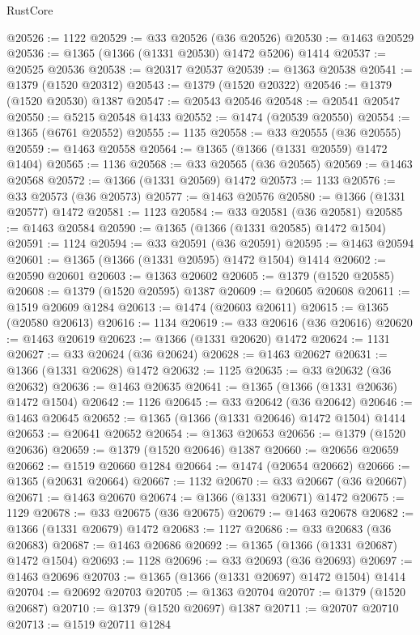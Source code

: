 \begin{lexlean}{RustCore}
\begin{coremodule}
@20526 := 1122
@20529 := @33 @20526 (@36 @20526)
@20530 := @1463 @20529
@20536 := @1365 (@1366 (@1331 @20530) @1472 @5206) @1414
@20537 := @20525 @20536
@20538 := @20317 @20537
@20539 := @1363 @20538
@20541 := @1379 (@1520 @20312)
@20543 := @1379 (@1520 @20322)
@20546 := @1379 (@1520 @20530) @1387
@20547 := @20543 @20546
@20548 := @20541 @20547
@20550 := @5215 @20548 @1433
@20552 := @1474 (@20539 @20550)
@20554 := @1365 (@6761 @20552)
@20555 := 1135
@20558 := @33 @20555 (@36 @20555)
@20559 := @1463 @20558
@20564 := @1365 (@1366 (@1331 @20559) @1472 @1404)
@20565 := 1136
@20568 := @33 @20565 (@36 @20565)
@20569 := @1463 @20568
@20572 := @1366 (@1331 @20569) @1472
@20573 := 1133
@20576 := @33 @20573 (@36 @20573)
@20577 := @1463 @20576
@20580 := @1366 (@1331 @20577) @1472
@20581 := 1123
@20584 := @33 @20581 (@36 @20581)
@20585 := @1463 @20584
@20590 := @1365 (@1366 (@1331 @20585) @1472 @1504)
@20591 := 1124
@20594 := @33 @20591 (@36 @20591)
@20595 := @1463 @20594
@20601 := @1365 (@1366 (@1331 @20595) @1472 @1504) @1414
@20602 := @20590 @20601
@20603 := @1363 @20602
@20605 := @1379 (@1520 @20585)
@20608 := @1379 (@1520 @20595) @1387
@20609 := @20605 @20608
@20611 := @1519 @20609 @1284
@20613 := @1474 (@20603 @20611)
@20615 := @1365 (@20580 @20613)
@20616 := 1134
@20619 := @33 @20616 (@36 @20616)
@20620 := @1463 @20619
@20623 := @1366 (@1331 @20620) @1472
@20624 := 1131
@20627 := @33 @20624 (@36 @20624)
@20628 := @1463 @20627
@20631 := @1366 (@1331 @20628) @1472
@20632 := 1125
@20635 := @33 @20632 (@36 @20632)
@20636 := @1463 @20635
@20641 := @1365 (@1366 (@1331 @20636) @1472 @1504)
@20642 := 1126
@20645 := @33 @20642 (@36 @20642)
@20646 := @1463 @20645
@20652 := @1365 (@1366 (@1331 @20646) @1472 @1504) @1414
@20653 := @20641 @20652
@20654 := @1363 @20653
@20656 := @1379 (@1520 @20636)
@20659 := @1379 (@1520 @20646) @1387
@20660 := @20656 @20659
@20662 := @1519 @20660 @1284
@20664 := @1474 (@20654 @20662)
@20666 := @1365 (@20631 @20664)
@20667 := 1132
@20670 := @33 @20667 (@36 @20667)
@20671 := @1463 @20670
@20674 := @1366 (@1331 @20671) @1472
@20675 := 1129
@20678 := @33 @20675 (@36 @20675)
@20679 := @1463 @20678
@20682 := @1366 (@1331 @20679) @1472
@20683 := 1127
@20686 := @33 @20683 (@36 @20683)
@20687 := @1463 @20686
@20692 := @1365 (@1366 (@1331 @20687) @1472 @1504)
@20693 := 1128
@20696 := @33 @20693 (@36 @20693)
@20697 := @1463 @20696
@20703 := @1365 (@1366 (@1331 @20697) @1472 @1504) @1414
@20704 := @20692 @20703
@20705 := @1363 @20704
@20707 := @1379 (@1520 @20687)
@20710 := @1379 (@1520 @20697) @1387
@20711 := @20707 @20710
@20713 := @1519 @20711 @1284

\end{coremodule}
\end{lexlean}
